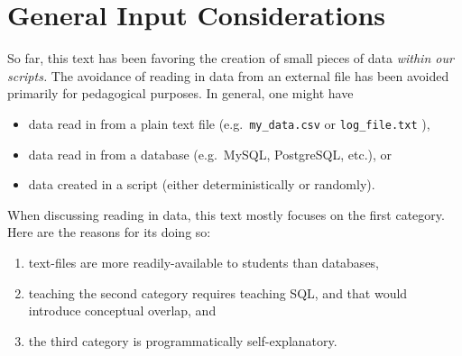 \documentclass[
  12pt,
  krantz2]{krantz}
\providecommand{\tightlist}{%
  \setlength{\itemsep}{0pt}\setlength{\parskip}{0pt}}
\begin{document}
\hypertarget{general-input-considerations}{%
\section{General Input Considerations}\label{general-input-considerations}}

So far, this text has been favoring the creation of small pieces of data \emph{within our scripts.} The avoidance of reading in data from an external file has been avoided primarily for pedagogical purposes. In general, one might have

\begin{itemize}
\tightlist
\item
  data read in from a plain text file (e.g.~\texttt{my\_data.csv} or \texttt{log\_file.txt} ),
\item
  data read in from a database (e.g.~MySQL, PostgreSQL, etc.), or
\item
  data created in a script (either deterministically or randomly).
\end{itemize}

When discussing reading in data, this text mostly focuses on the first category. Here are the reasons for its doing so:

\begin{enumerate}
\def\labelenumi{\arabic{enumi}.}
\tightlist
\item
  text-files are more readily-available to students than databases,
\item
  teaching the second category requires teaching SQL, and that would introduce conceptual overlap, and
\item
  the third category is programmatically self-explanatory.
\end{enumerate}
\end{document}
